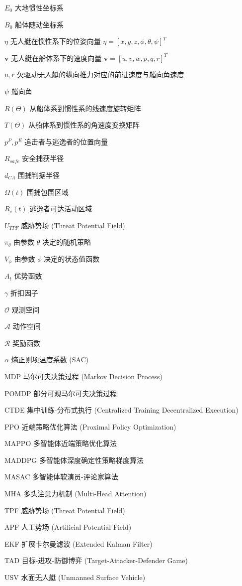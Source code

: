 \begin{denotation}[3.5cm]
\item[$E_0$] 大地惯性坐标系
\item[$B_0$] 船体随动坐标系
\item[$\eta$] 无人艇在惯性系下的位姿向量 $\eta=[x,y,z,\phi,\theta,\psi]^T$
\item[$\bm{v}$] 无人艇在船体系下的速度向量 $\bm{v}=[u,v,w,p,q,r]^T$
\item[$u,r$] 欠驱动无人艇的纵向推力对应的前进速度与艏向角速度
\item[$\psi$] 艏向角
\item[$R(\Theta)$] 从船体系到惯性系的线速度旋转矩阵
\item[$T(\Theta)$] 从船体系到惯性系的角速度变换矩阵
\item[$p^P, p^E$] 追击者与逃逸者的位置向量
\item[$R_{safe}$] 安全捕获半径
\item[$d_{CA}$] 围捕判据半径
\item[$\Omega(t)$] 围捕包围区域
\item[$R_e(t)$] 逃逸者可达活动区域
\item[$U_{TPF}$] 威胁势场 (Threat Potential Field)
\item[$\pi_\theta$] 由参数 $\theta$ 决定的随机策略
\item[$V_\phi$] 由参数 $\phi$ 决定的状态值函数
\item[$A_t$] 优势函数
\item[$\gamma$] 折扣因子
\item[$\mathcal{O}$] 观测空间
\item[$\mathcal{A}$] 动作空间
\item[$\mathcal{R}$] 奖励函数
\item[$\alpha$] 熵正则项温度系数 (SAC)
\item[MDP] 马尔可夫决策过程 (Markov Decision Process)
\item[POMDP] 部分可观马尔可夫决策过程
\item[CTDE] 集中训练-分布式执行 (Centralized Training Decentralized Execution)
\item[PPO] 近端策略优化算法 (Proximal Policy Optimization)
\item[MAPPO] 多智能体近端策略优化算法
\item[MADDPG] 多智能体深度确定性策略梯度算法
\item[MASAC] 多智能体软演员-评论家算法
\item[MHA] 多头注意力机制 (Multi-Head Attention)
\item[TPF] 威胁势场 (Threat Potential Field)
\item[APF] 人工势场 (Artificial Potential Field)
\item[EKF] 扩展卡尔曼滤波 (Extended Kalman Filter)
\item[TAD] 目标-进攻-防御博弈 (Target-Attacker-Defender Game)
\item[USV] 水面无人艇 (Unmanned Surface Vehicle)
\end{denotation}
